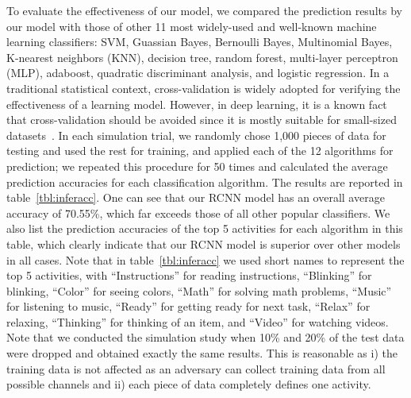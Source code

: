 \indent To evaluate the effectiveness of our model, we compared the prediction results by our model with those of other 11 most widely-used and well-known machine learning classifiers: SVM, Guassian Bayes, Bernoulli Bayes, Multinomial Bayes, K-nearest neighbors (KNN), decision tree, random forest, multi-layer perceptron (MLP), adaboost, quadratic discriminant analysis, and logistic regression. In a traditional statistical context, cross-validation is widely adopted for verifying the effectiveness of a learning model. However, in deep learning, it is a known fact that cross-validation should be avoided  since it is mostly suitable for small-sized datasets~\cite{deepcrossvalid}. In each simulation trial, we randomly chose 1,000 pieces of data for testing and used the rest for training, and applied each of the 12 algorithms for prediction; we repeated this procedure for 50 times and calculated the average prediction accuracies for each classification algorithm. The results are reported in table~\ref{tbl:inferacc}. One can see that our RCNN model has an overall average accuracy of 70.55\%, which far exceeds those of all other popular classifiers. We also list the prediction accuracies of the top 5 activities for each algorithm in this table, which clearly indicate that our RCNN model is superior over other models in all cases. Note that in table~\ref{tbl:inferacc} we used short names to represent the top 5 activities, with ``Instructions'' for reading instructions, ``Blinking'' for blinking, ``Color'' for seeing colors, ``Math'' for solving math problems, ``Music'' for listening to music, ``Ready'' for getting ready for next task, ``Relax'' for relaxing, ``Thinking'' for thinking of an item, and ``Video'' for watching videos.   %
Note that we conducted the simulation study when 10\% and 20\% of the test data were dropped and obtained exactly the same results. This is reasonable as i) the training data is not affected as an adversary can collect training data from all possible channels and ii) each piece of data completely defines one activity.


